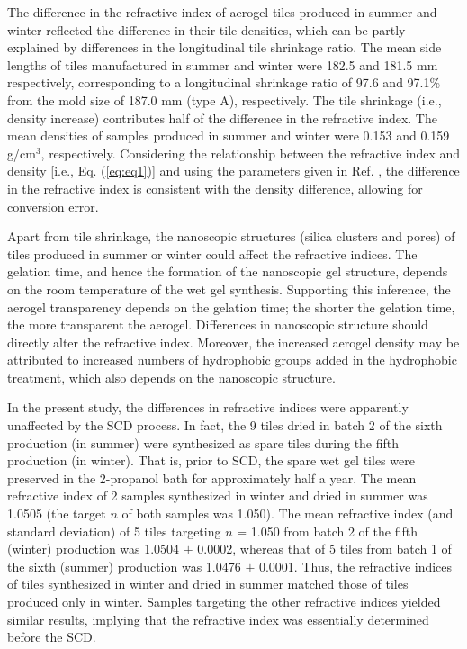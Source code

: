 \documentclass[5p,twocolumn]{elsarticle}
\begin{document}
The difference in the refractive index of aerogel tiles produced in summer and winter reflected the difference in their tile densities, which can be partly explained by differences in the longitudinal tile shrinkage ratio. The mean side lengths of tiles manufactured in summer and winter were 182.5 and 181.5 mm respectively, corresponding to a longitudinal shrinkage ratio of 97.6 and 97.1\% from the mold size of 187.0 mm (type A), respectively. The tile shrinkage (i.e., density increase) contributes half of the difference in the refractive index. The mean densities of samples produced in summer and winter were 0.153 and 0.159 g/cm$^3$, respectively. Considering the relationship between the refractive index and density [i.e., Eq. (\ref{eq:eq1})] and using the parameters given in Ref. \cite{cite2}, the difference in the refractive index is consistent with the density difference, allowing for conversion error.

Apart from tile shrinkage, the nanoscopic structures (silica clusters and pores) of tiles produced in summer or winter could affect the refractive indices. The gelation time, and hence the formation of the nanoscopic gel structure, depends on the room temperature of the wet gel synthesis. Supporting this inference, the aerogel transparency depends on the gelation time; the shorter the gelation time, the more transparent the aerogel. Differences in nanoscopic structure should directly alter the refractive index. Moreover, the increased aerogel density may be attributed to increased numbers of hydrophobic groups added in the hydrophobic treatment, which also depends on the nanoscopic structure.

In the present study, the differences in refractive indices were apparently unaffected by the SCD process. In fact, the 9 tiles dried in batch 2 of the sixth production (in summer) were synthesized as spare tiles during the fifth production (in winter). That is, prior to SCD, the spare wet gel tiles were preserved in the 2-propanol bath for approximately half a year. The mean refractive index of 2 samples synthesized in winter and dried in summer was 1.0505 (the target $n$ of both samples was 1.050). The mean refractive index (and standard deviation) of 5 tiles targeting $n$ = 1.050 from batch 2 of the fifth (winter) production was 1.0504 $\pm $ 0.0002, whereas that of 5 tiles from batch 1 of the sixth (summer) production was 1.0476 $\pm $ 0.0001. Thus, the refractive indices of tiles synthesized in winter and dried in summer matched those of tiles produced only in winter. Samples targeting the other refractive indices yielded similar results, implying that the refractive index was essentially determined before the SCD.
\end{document}
